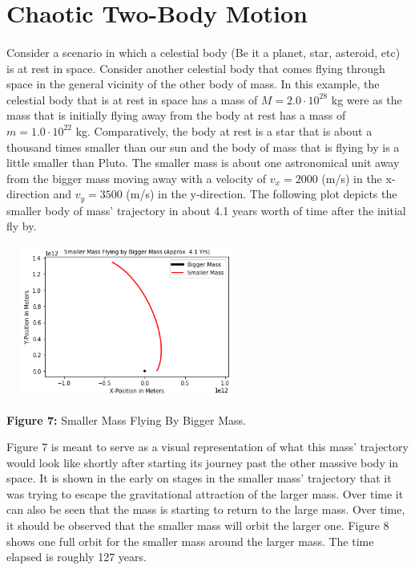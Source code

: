 \documentclass[]{article}
\begin{document}
\section{Chaotic Two-Body Motion}
\begin{multicols}{2}
\paragraph{}
\setlength{\parskip}{1em}
Consider a scenario in which a celestial body (Be it a planet, star, asteroid, etc) is at rest in space. Consider another celestial body that comes flying through space in the general vicinity of the other body of mass. In this example, the celestial body that is at rest in space has a mass of $M=2.0\cdot10^{28}$ kg were as the mass that is initially flying away from the body at rest has a mass of $m=1.0\cdot10^{22}$ kg. Comparatively, the body at rest is a star that is about a thousand times smaller than our sun and the body of mass that is flying by is a little smaller than Pluto. The smaller mass is about one astronomical unit away from the bigger mass moving away with a velocity of $v_{x}=2000$ (m/s) in the x-direction and $v_{y}=3500$ (m/s) in the y-direction. The following plot depicts the smaller body of mass' trajectory in about 4.1 years worth of time after the initial fly by.
\begin{center}
\includegraphics[width=8cm, height=5.0cm]{PHYS 342 FP 2-Body Fly By (1).png}
\caption{\small{\textbf{Figure 7:}} \tiny{Smaller Mass Flying By Bigger Mass.}}
\end{center}
Figure 7 is meant to serve as a visual representation of what this mass' trajectory would look like shortly after starting its journey past the other massive body in space. It is shown in the early on stages in the smaller mass' trajectory that it was trying to escape the gravitational attraction of the larger mass. Over time it can also be seen that the mass is starting to return to the large mass. Over time, it should be observed that the smaller mass will orbit the larger one. Figure 8 shows one full orbit for the smaller mass around the larger mass. The time elapsed is roughly 127 years.

\end{multicols}
\end{document}
